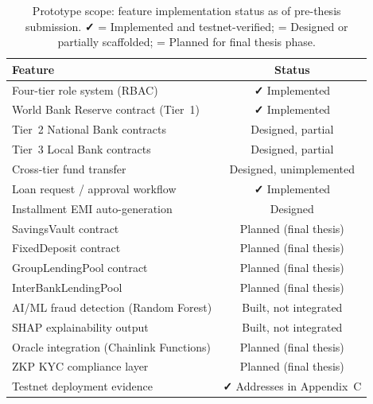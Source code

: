 \documentclass[12pt,a4paper]{report}
\newcommand{\tmarkDone}{\textbf{\faCheck}}
\newcommand{\tmarkPartial}{\faHourglassHalf}
\newcommand{\tmarkPlanned}{\textcolor{black!55}{\faCircle}}
\newcommand{\tableheadcolor}{\rowcolor{black!8}}
\newcommand{\tableheadfont}{\bfseries\small}
\begin{document}
\begin{table}[H]
\centering
\caption{Prototype scope: feature implementation status as of pre-thesis submission. \tmarkDone{} = Implemented and testnet-verified; \tmarkPartial{} = Designed or partially scaffolded; \tmarkPlanned{} = Planned for final thesis phase.}
\label{tab:prototype-scope}
\renewcommand{\arraystretch}{1.3}
\small
\begin{tabular}{@{}p{7.5cm}c@{}}
\toprule
\tableheadcolor
\tableheadfont Feature & \tableheadfont Status \\
\midrule
Four-tier role system (RBAC) & \tmarkDone{} Implemented \\
\rowcolor{RowShade}
World Bank Reserve contract (Tier~1) & \tmarkDone{} Implemented \\
Tier~2 National Bank contracts & \tmarkPartial{} Designed, partial \\
\rowcolor{RowShade}
Tier~3 Local Bank contracts & \tmarkPartial{} Designed, partial \\
Cross-tier fund transfer & \tmarkPartial{} Designed, unimplemented \\
\rowcolor{RowShade}
Loan request / approval workflow & \tmarkDone{} Implemented \\
Installment EMI auto-generation & \tmarkPartial{} Designed \\
\rowcolor{RowShade}
SavingsVault contract & \tmarkPlanned{} Planned (final thesis) \\
FixedDeposit contract & \tmarkPlanned{} Planned (final thesis) \\
\rowcolor{RowShade}
GroupLendingPool contract & \tmarkPlanned{} Planned (final thesis) \\
InterBankLendingPool & \tmarkPlanned{} Planned (final thesis) \\
\rowcolor{RowShade}
AI/ML fraud detection (Random Forest) & \tmarkPartial{} Built, not integrated \\
SHAP explainability output & \tmarkPartial{} Built, not integrated \\
\rowcolor{RowShade}
Oracle integration (Chainlink Functions) & \tmarkPlanned{} Planned (final thesis) \\
ZKP KYC compliance layer & \tmarkPlanned{} Planned (final thesis) \\
\rowcolor{RowShade}
Testnet deployment evidence & \tmarkDone{} Addresses in Appendix~C \\
\bottomrule
\end{tabular}
\end{table}
\end{document}
